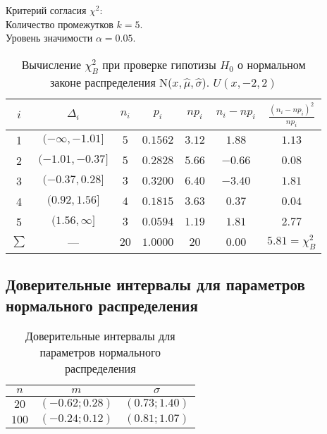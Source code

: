 \documentclass[12pt,a4paper]{article}
\begin{document}
			Критерий согласия $\chi^2$:\\
			Количество промежутков $k = 5$.\\
			Уровень значимости $\alpha = 0.05$.
			\begin{table}[H]
				\begin{center}
					\begin{tabular}{|c|c|c|c|c|c|c|}
						\hline
						$i$ & $\Delta_i$          &   $n_i$ &   $p_i$ &   $np_i$ &   $n_i-np_i$ &   $\frac{(n_i-np_i)^2}{np_i}$ \\
						\hline
						1   & $(-\infty, -1.01]$ & $5$  & $0.1562$ & $3.12$ & $1.88$  & $1.13$ \\
						2   & $(-1.01, -0.37]$   & $5$  & $0.2828$ & $5.66$ & $-0.66$ & $0.08$ \\
						3   & $(-0.37, 0.28]$    & $3$  & $0.3200$ & $6.40$ & $-3.40$ & $1.81$ \\
						4   & $(0.92, 1.56]$     & $4$  & $0.1815$ & $3.63$ & $0.37$  & $0.04$ \\
						5   & $(1.56, \infty]$   & $3$  & $0.0594$ & $1.19$ & $1.81$  & $2.77$ \\
						$\sum$ & ---             & $20$ & $1.0000$ & $20$   & $0.00$  & $5.81 = \chi^2_B$ \\
						\hline
					\end{tabular}
				\end{center}
				\caption{Вычисление $\chi^2_B$ при проверке гипотизы $H_0$ о нормальном законе распределения N($x, \hat{\mu}, \hat{\sigma}$). $U(x, -2, 2)$}
			\end{table}
			
	\subsection{Доверительные интервалы для параметров нормального распределения}
		\begin{table}[H]
			\begin{center}
				\begin{tabular}{|c|c|c|}
					\hline
					$n$ & $m$ & $\sigma$\\
					\hline
					$20$ & $(-0.62; 0.28)$ & $(0.73; 1.40)$\\ 
					\hline
					$100$ & $(-0.24; 0.12)$ & $(0.81; 1.07)$\\
					\hline
				\end{tabular}
			\end{center}
			\caption{Доверительные интервалы для параметров нормального распределения}
		\end{table}
		
\end{document}
